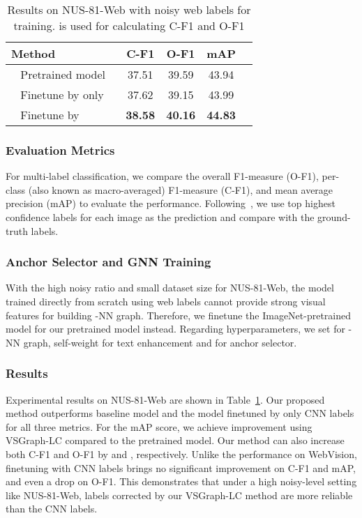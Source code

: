 \documentclass[sigconf]{acmart}
\begin{document}
\setlength{\tabcolsep}{4pt}
\begin{table}
	\centering
	\caption{Results on NUS-81-Web with noisy web labels for training.  is used for calculating C-F1 and O-F1}
	\label{tab:nuswide}
\begin{tabular}{lcccc}
		\toprule 
Method & C-F1 & O-F1 & mAP \\
		\midrule
		~ Pretrained model ~  &37.51 &39.59 &43.94\\
		~ Finetune by  only~ &37.62 &39.15 &43.99 \\
		~ Finetune by ~ & \textbf{38.58} & \textbf{40.16} &\textbf{44.83}\\
		\bottomrule
	\end{tabular}
\end{table}

\subsubsection{Evaluation Metrics}
For multi-label classification, we compare the overall F1-measure (O-F1), per-class (also known as macro-averaged) F1-measure (C-F1), and mean average precision (mAP) to evaluate the performance.
Following~\cite{Wang2016cnnrnn}, we use top  highest confidence labels for each image as the prediction and compare with the ground-truth labels. 

\subsubsection{Anchor Selector and GNN Training}
With the high noisy ratio and small dataset size for NUS-81-Web, the model trained directly from scratch using web labels cannot provide strong visual features for building -NN graph. 
Therefore, we finetune the ImageNet-pretrained model for our pretrained model  instead. Regarding hyperparameters, we set  for -NN graph, self-weight  for text enhancement and  for anchor selector.  

\subsubsection{Results}
Experimental results on NUS-81-Web are shown in Table~\ref{tab:nuswide}. Our proposed method outperforms baseline model and the model finetuned by only CNN labels for all three metrics.
For the mAP score, we achieve  improvement using VSGraph-LC compared to the pretrained model. Our method can also increase both C-F1 and O-F1 by  and , respectively.
Unlike the performance on WebVision, finetuning with CNN labels brings no significant improvement on C-F1 and mAP, and even a  drop on O-F1. 
This demonstrates that under a high noisy-level setting like NUS-81-Web, labels corrected by our VSGraph-LC method are more reliable than the CNN labels.
\end{document}
